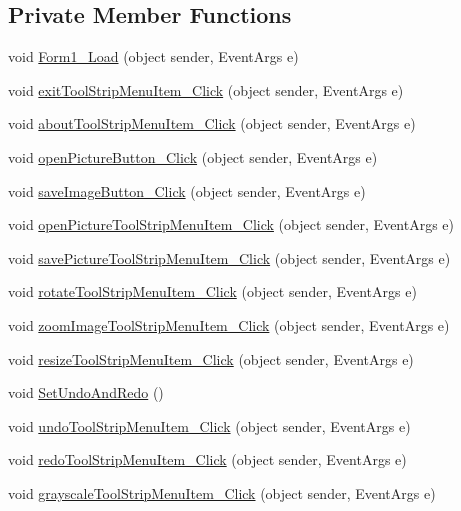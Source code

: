 \subsection*{Private Member Functions}
\begin{DoxyCompactItemize}
\item 
void \hyperlink{class_u_i_1_1_shopped_gui_ad9bcb5a3a89de53a6ef580bd806fae26}{Form1\_\-Load} (object sender, EventArgs e)
\item 
void \hyperlink{class_u_i_1_1_shopped_gui_a4c3239cc225d230bafb0cc53a9f49e2c}{exitToolStripMenuItem\_\-Click} (object sender, EventArgs e)
\item 
void \hyperlink{class_u_i_1_1_shopped_gui_a04958c8af963e508601e03e14bfb8bb8}{aboutToolStripMenuItem\_\-Click} (object sender, EventArgs e)
\item 
void \hyperlink{class_u_i_1_1_shopped_gui_a5a4be38d87e3d968e9336400e572b646}{openPictureButton\_\-Click} (object sender, EventArgs e)
\item 
void \hyperlink{class_u_i_1_1_shopped_gui_a205444f0fff14792394724b4eb22601d}{saveImageButton\_\-Click} (object sender, EventArgs e)
\item 
void \hyperlink{class_u_i_1_1_shopped_gui_a059988dec5a74fcc82ee2eb503d49118}{openPictureToolStripMenuItem\_\-Click} (object sender, EventArgs e)
\item 
void \hyperlink{class_u_i_1_1_shopped_gui_a79d60e553769283f7b9ec8af7a9d3dc1}{savePictureToolStripMenuItem\_\-Click} (object sender, EventArgs e)
\item 
void \hyperlink{class_u_i_1_1_shopped_gui_a8b4824c0552bcfe814bbf8437cb87ec2}{rotateToolStripMenuItem\_\-Click} (object sender, EventArgs e)
\item 
void \hyperlink{class_u_i_1_1_shopped_gui_a5f99b03c74d01734153873d6c35fbdf3}{zoomImageToolStripMenuItem\_\-Click} (object sender, EventArgs e)
\item 
void \hyperlink{class_u_i_1_1_shopped_gui_a05e2b57477f10f88b1ee06b6b5aa4d86}{resizeToolStripMenuItem\_\-Click} (object sender, EventArgs e)
\item 
void \hyperlink{class_u_i_1_1_shopped_gui_a99e47a8b843bf190a7a0e3f8b3f5abb9}{SetUndoAndRedo} ()
\item 
void \hyperlink{class_u_i_1_1_shopped_gui_a167624483eae61dcbe7de755ad0549a5}{undoToolStripMenuItem\_\-Click} (object sender, EventArgs e)
\item 
void \hyperlink{class_u_i_1_1_shopped_gui_a5828d5deddf5b8453e01db469a1a6f83}{redoToolStripMenuItem\_\-Click} (object sender, EventArgs e)
\item 
void \hyperlink{class_u_i_1_1_shopped_gui_a9bfb029eb21eb1c7c4fddcee35d1d9fc}{grayscaleToolStripMenuItem\_\-Click} (object sender, EventArgs e)
\end{DoxyCompactItemize}
